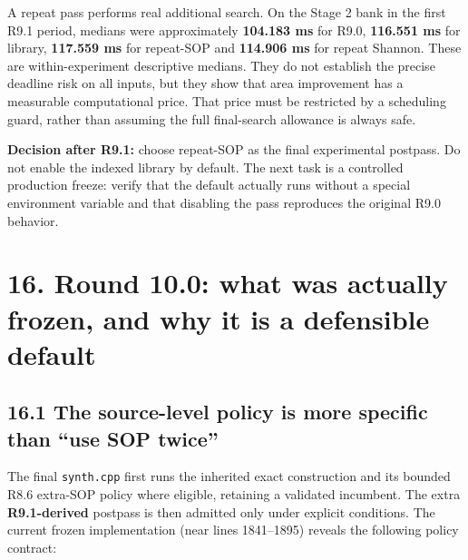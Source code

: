 \documentclass[a4paper,10pt]{article}
\theoremstyle{definition}
\theoremstyle{remark}
\begin{document}
A repeat pass performs real additional search. On the Stage 2 bank in the first R9.1 period, medians were approximately \textbf{104.183 ms} for R9.0, \textbf{116.551 ms} for library, \textbf{117.559 ms} for repeat-SOP and \textbf{114.906 ms} for repeat Shannon. These are within-experiment descriptive medians. They do not establish the precise deadline risk on all inputs, but they show that area improvement has a measurable computational price. That price must be restricted by a scheduling guard, rather than assuming the full final-search allowance is always safe.

\begin{tcolorbox}[colback=ResearchBlue!6!white,colframe=ResearchSlate!55!white,boxrule=0.65pt,arc=1mm,breakable]
\textbf{Decision after R9.1:} choose repeat-SOP as the final experimental postpass. Do not enable the indexed library by default. The next task is a controlled production freeze: verify that the default actually runs without a special environment variable and that disabling the pass reproduces the original R9.0 behavior.
\end{tcolorbox}

\section{16. Round 10.0: what was actually frozen, and why it is a defensible default}\label{round-10.0-what-was-actually-frozen-and-why-it-is-a-defensible-default}

\subsection{16.1 The source-level policy is more specific than ``use SOP twice''}\label{the-source-level-policy-is-more-specific-than-use-sop-twice}

The final \texttt{synth.cpp} first runs the inherited exact construction and its bounded R8.6 extra-SOP policy where eligible, retaining a validated incumbent. The extra \textbf{R9.1-derived} postpass is then admitted only under explicit conditions. The current frozen implementation (near lines 1841--1895) reveals the following policy contract:
\end{document}
